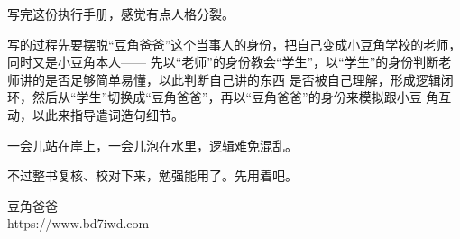 

\vspace{0.4cm}

写完这份执行手册，感觉有点人格分裂。

写的过程先要摆脱“豆角爸爸”这个当事人的身份，把自己变成小豆角学校的老师，同时又是小豆角本人——
先以“老师”的身份教会“学生”，以“学生”的身份判断老师讲的是否足够简单易懂，以此判断自己讲的东西
是否被自己理解，形成逻辑闭环，然后从“学生”切换成“豆角爸爸”，再以“豆角爸爸”的身份来模拟跟小豆
角互动，以此来指导遣词造句细节。

一会儿站在岸上，一会儿泡在水里，逻辑难免混乱。

不过整书复核、校对下来，勉强能用了。先用着吧。

\vfill

\begin{center}
{\kaishu\large 豆角爸爸}\\[4pt]
{\small\color{tipc} https://www.bd7iwd.com}
\end{center}

\vspace{0.6cm}
